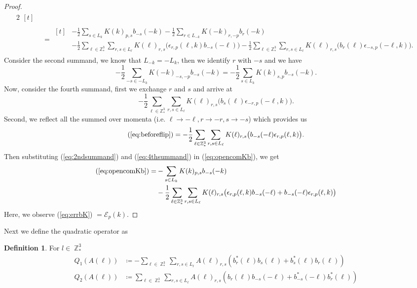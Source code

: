 \documentclass[sn-mathphys,Numbered, a4paper ,nocrop]{sn-jnl}%
\DeclareMathOperator{\Z}{\mathbb{Z}}
\newcommand{\half}{\frac{1}{2}}
\theoremstyle{plain}
\theoremstyle{definition}
\newtheorem{definition}[theorem]{Definition}
\theoremstyle{remark}
\theoremstyle{plain}
\theoremstyle{definition}
\theoremstyle{remark}
\begin{document}
\begin{proof}
\begin{alignat}{2}
\begin{aligned}[t]
      \end{aligned}\nonumber\\
      &=\begin{aligned}[t]
          &-\half\sum\limits_{s\in L_k}K(k)_{p,s}b_{-s}(-k) - \half\sum\limits_{r\in L_{-k}}K(-k)_{r,-p}b_{r}(-k) \\
      &- \half\sum\limits_{\ell\in \mathbb{Z}^3_*}\sum\limits_{r,s\in L_\ell}K(\ell)_{r,s}\big(\epsilon_{r,p}(\ell,k)b_{-s}(-\ell)\big) - \half\sum\limits_{\ell\in \mathbb{Z}^3_*}\sum\limits_{r,s\in L_\ell}K(\ell)_{r,s}\big(b_{r}(\ell)\epsilon_{-s,p}(-\ell,k)\big).\label{eq:opencomKb}
      \end{aligned}
   \end{alignat}
   Consider the second summand, we know that $L_{-k}=-L_k$,
   then we identify $r$ with $-s$ and we have
   \begin{equation}\label{eq:2ndsummand}
        - \half\sum\limits_{-s\in -L_{k}}K(-k)_{-s,-p}b_{-s}(-k) =- \half\sum\limits_{s\in L_{k}}K(k)_{s,p}b_{-s}(-k) .
   \end{equation}
   Now, consider the fourth summand, first we exchange $r$ and $s$ and arrive at
   \begin{equation}\label{eq:beforeflip}
       - \half\sum\limits_{\ell\in \mathbb{Z}^3_*}\sum\limits_{r,s\in L_\ell}K(\ell)_{r,s}\big(b_{s}(\ell)\epsilon_{-r,p}(-\ell,k)\big).
   \end{equation}
   Second, we reflect all the summed over momenta (i.e. $\ell\rightarrow-\ell, r\rightarrow-r, s\rightarrow-s$) which provides us
   \begin{equation}\label{eq:4thsummand}
       (\ref{eq:beforeflip}) = - \half\sum\limits_{\ell\in \mathbb{Z}^3_*}\sum\limits_{r,s\in L_\ell}K(\ell)_{r,s}\big(b_{-s}(-\ell)\epsilon_{r,p}(\ell,k)\big).
   \end{equation}
   Then substituting (\ref{eq:2ndsummand}) and (\ref{eq:4thsummand}) in (\ref{eq:opencomKb}), we get
   \begin{align}
       (\ref{eq:opencomKb})=&-\sum\limits_{s\in L_k}K(k)_{p,s}b_{-s}(-k)  \\
      &- \half\sum\limits_{\ell\in \mathbb{Z}^3_*}\sum\limits_{r,s\in L_\ell}K(\ell)_{r,s}\big(\epsilon_{r,p}(\ell,k)b_{-s}(-\ell)+b_{-s}(-\ell)\epsilon_{r,p}(\ell,k)\big)\label{eq:errbK}
   \end{align}
   Here, we observe (\ref{eq:errbK}) $=  \mathcal{E}_{p}(k) $.
\end{proof}
Next we define the quadratic operator as\newline
\begin{definition}
For $l \in \Z^3_*$
\begin{align} 
    Q_1(A(\ell))&\coloneq  -\sum\limits_{\ell \in \Z^3_*}\sum\limits_{r,s \in L_{\ell}}A(\ell)_{r,s} \left(b^*_r(\ell)b_{s}(\ell)+b^*_{s}(\ell)b_{r}(\ell)\right)\label{eq:Q1}\\ 
    Q_2(A(\ell))&\coloneq  \sum\limits_{\ell \in \Z^3_*}\sum\limits_{r,s \in L_{\ell}}A(\ell)_{r,s} \left(b_r(\ell)b_{-s}(-\ell)+b^*_{-s}(-\ell)b^*_{r}(\ell)\right)\label{eq:Q2}
\end{align}
    
\end{definition}
\end{document}
